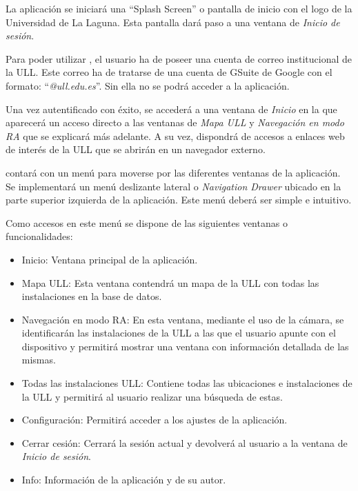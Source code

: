 La aplicación se iniciará una ``Splash Screen'' \cite{URL::SplashScreen} o pantalla de inicio con el logo de la Universidad de La Laguna. Esta pantalla dará paso a una ventana de \textit{Inicio de sesión}.

Para poder utilizar \ULLAR{}, el usuario ha de poseer una cuenta de correo institucional de la ULL. Este correo ha de tratarse de una cuenta de GSuite \cite{URL::gsuite} de Google con el formato: ``\textit{@ull.edu.es}''. Sin ella no se podrá acceder a la aplicación.

Una vez autentificado con éxito, se accederá a una ventana de \textit{Inicio} en la que aparecerá un acceso directo a las ventanas de \textit{Mapa ULL} y \textit{Navegación en modo RA} que se  explicará más adelante. A su vez, dispondrá de accesos a enlaces web de interés de la ULL que se abrirán en un navegador externo. 

\ULLAR{} contará con un menú para moverse por las diferentes ventanas de la aplicación. Se implementará un menú deslizante lateral o \textit{Navigation Drawer} \cite{URL::NavigationDraw} ubicado en la parte superior izquierda de la aplicación. Este menú deberá ser simple e intuitivo.

Como accesos en este menú se dispone de las siguientes ventanas o funcionalidades:

\begin{itemize}
    \item Inicio: Ventana principal de la aplicación.
    \item Mapa ULL: Esta ventana contendrá un mapa de la ULL con todas las instalaciones en la base de datos.
    \item Navegación en modo RA: En esta ventana, mediante el uso de la cámara, se identificarán las instalaciones de la ULL a las que el usuario apunte con el dispositivo y permitirá mostrar una ventana con información detallada de las mismas.
    \item Todas las instalaciones ULL: Contiene todas las ubicaciones e instalaciones de la ULL y permitirá al usuario realizar una búsqueda de estas. 
    \item Configuración: Permitirá acceder a los ajustes de la aplicación.
    \item Cerrar cesión: Cerrará la sesión actual y devolverá al usuario a la ventana de \textit{Inicio de sesión}.
    \item Info: Información de la aplicación y de su autor.
\end{itemize}


